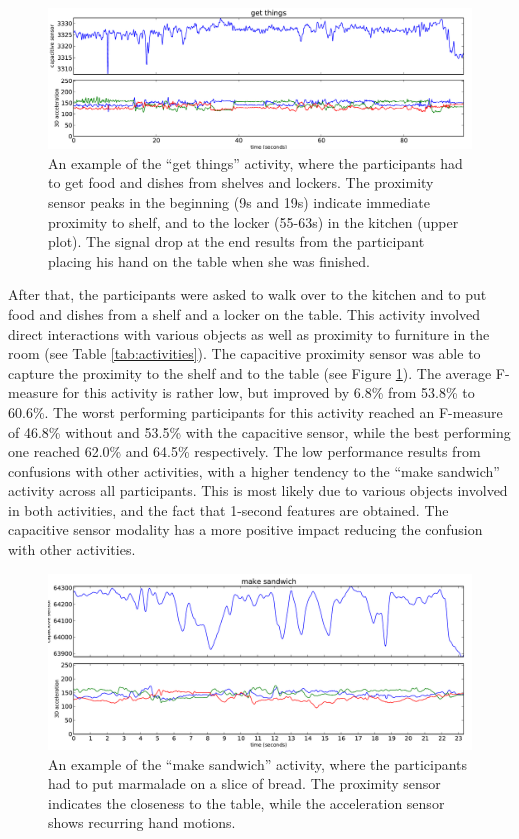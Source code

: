 \documentclass[runningheads,a4paper]{llncs}
\begin{document}
\begin{figure}[t]
	\centering
		\includegraphics[width=\textwidth]{../Auswertung/images/tobias_4.pdf}
	\caption{An example of the ``get things'' activity, where the participants had to get food and dishes from shelves and lockers. The proximity sensor peaks in the beginning (9s and 19s) indicate immediate proximity to shelf, and to the locker (55-63s) in the kitchen (upper plot). The signal drop at the end results from the participant placing his hand on the table when she was finished.}
	\label{fig:get_things}
\end{figure}

After that, the participants were asked to walk over to the kitchen and to put food and dishes from a shelf and a locker on the table. This activity involved direct interactions with various objects as well as proximity to furniture in the room (see Table \ref{tab:activities}). The capacitive proximity sensor was able to capture the proximity to the shelf and to the table (see Figure \ref{fig:get_things}). The average F-measure for this activity is rather low, but improved by 6.8\% from 53.8\% to 60.6\%. 
The worst performing participants for this activity reached an F-measure of 46.8\% without and 53.5\% with the capacitive sensor, while the best performing one reached 62.0\% and 64.5\% respectively. The low performance results from confusions with other activities, with a higher tendency to the ``make sandwich'' activity across all participants. This is most likely due to various objects involved in both activities, and the fact that 1-second features are obtained. The capacitive sensor modality has a more positive impact reducing the confusion with other activities.

\begin{figure}[h]
	\centering
		\includegraphics[width=\textwidth]{../Auswertung/images/eugen_5.pdf}
	\caption{An example of the ``make sandwich'' activity, where the participants had to put marmalade on a slice of bread. The proximity sensor indicates the closeness to the table, while the acceleration sensor shows recurring hand motions.}
	\label{fig:prep_bread}
\end{figure}
\end{document}
